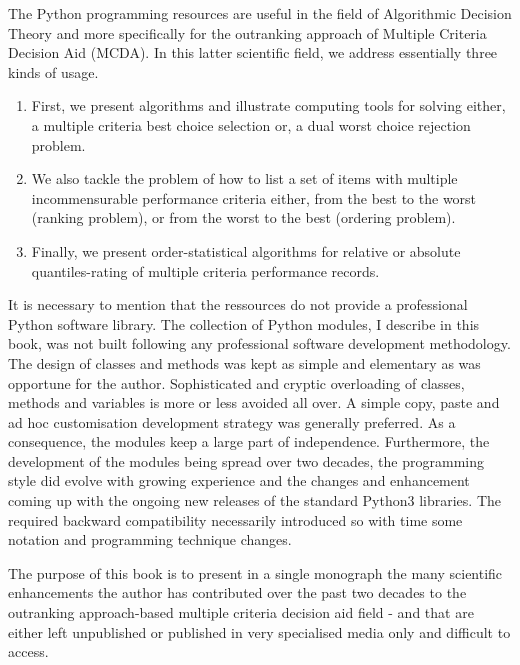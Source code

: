 The \Digraph Python programming resources are useful in the field of Algorithmic Decision Theory and more specifically for the outranking approach of Multiple Criteria Decision Aid (MCDA). In this latter scientific field, we address essentially three kinds of usage.
\begin{enumerate}[topsep=3pt,partopsep=0pt]
\item First, we present algorithms and illustrate computing tools for solving either, a multiple criteria best choice selection or, a dual worst choice rejection problem. 
\item We also tackle the problem of how to list a set of items with multiple incommensurable performance criteria either, from the best to the worst (ranking problem), or from the worst to the best (ordering problem).
\item Finally, we present order-statistical algorithms for relative or absolute quantiles-rating of multiple criteria performance records.
\end{enumerate}

It is necessary to mention that the \Digraph ressources do not provide a professional Python software library. The collection of Python modules, I describe in this book, was not built following any professional software development methodology. The design of classes and methods was kept as simple and elementary as was opportune for the author. Sophisticated and cryptic overloading of classes, methods and variables is more or less avoided all over. A simple copy, paste and ad hoc customisation development strategy was generally preferred. As a consequence, the \Digraph modules keep a large part of independence.  Furthermore, the development of the \Digraph modules being spread over two decades, the programming style did evolve with growing experience and the changes and enhancement coming up with the ongoing new releases of the standard Python3 libraries. The required backward compatibility necessarily introduced so with time some notation and programming technique changes.


The purpose of this book is to present in a single monograph the many scientific enhancements the author has contributed over the past two decades to the outranking approach-based multiple criteria decision aid field - and that are either left unpublished or published in very specialised media only and difficult to access.  

